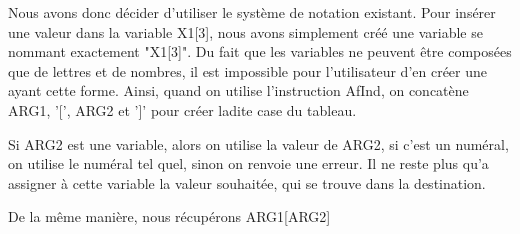 \documentclass{article}
\begin{document}
Nous avons donc décider d'utiliser le système de notation existant. Pour insérer une valeur dans la variable X1[3], nous avons simplement créé une variable se nommant exactement "X1[3]".
Du fait que les variables ne peuvent être composées que de lettres et de nombres, il est impossible pour l'utilisateur d'en créer une ayant cette forme.
Ainsi, quand on utilise l'instruction AfInd, on concatène ARG1, '[', ARG2 et ']' pour créer ladite case du tableau.

Si ARG2 est une variable, alors on utilise la valeur de ARG2, si c'est un numéral, on utilise le numéral tel quel, sinon on renvoie une erreur.
Il ne reste plus qu'a assigner à cette variable la valeur souhaitée, qui se trouve dans la destination.

De la même manière, nous récupérons ARG1[ARG2]
\end{document}
